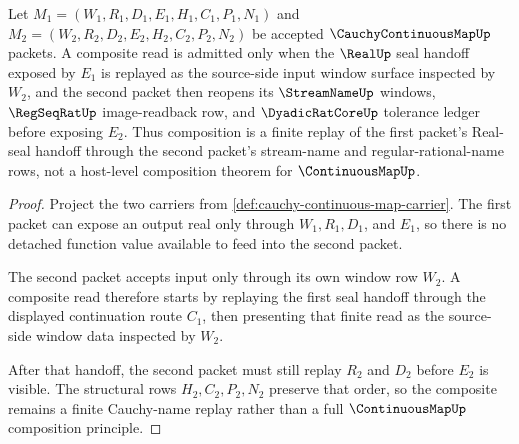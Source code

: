 \begin{theorem}
\label{thm:cauchy-continuous-map-window-composition}
Let $M_1=(W_1,R_1,D_1,E_1,H_1,C_1,P_1,N_1)$ and $M_2=(W_2,R_2,D_2,E_2,H_2,C_2,P_2,N_2)$ be accepted $\CauchyContinuousMapUp$ packets. A composite read is admitted only when the $\RealUp$ seal handoff exposed by $E_1$ is replayed as the source-side input window surface inspected by $W_2$, and the second packet then reopens its $\StreamNameUp$ windows, $\RegSeqRatUp$ image-readback row, and $\DyadicRatCoreUp$ tolerance ledger before exposing $E_2$. Thus composition is a finite replay of the first packet's Real-seal handoff through the second packet's stream-name and regular-rational-name rows, not a host-level composition theorem for $\ContinuousMapUp$.
\end{theorem}
\begin{proof}
Project the two carriers from \autoref{def:cauchy-continuous-map-carrier}. The first packet can expose an output real only through $W_1,R_1,D_1$, and $E_1$, so there is no detached function value available to feed into the second packet.

The second packet accepts input only through its own window row $W_2$. A composite read therefore starts by replaying the first seal handoff through the displayed continuation route $C_1$, then presenting that finite read as the source-side window data inspected by $W_2$.

After that handoff, the second packet must still replay $R_2$ and $D_2$ before $E_2$ is visible. The structural rows $H_2,C_2,P_2,N_2$ preserve that order, so the composite remains a finite Cauchy-name replay rather than a full $\ContinuousMapUp$ composition principle.
\end{proof}

